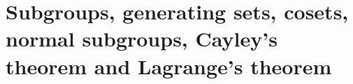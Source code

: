 
\chapter{Subgroups, generating sets, cosets, normal subgroups, Cayley's theorem and Lagrange's theorem}

